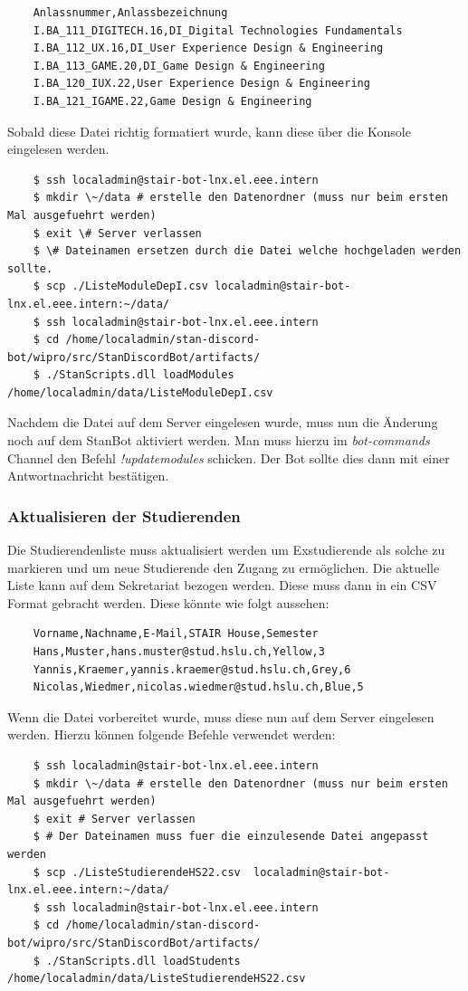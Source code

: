 \documentclass[a4paper, table]{article}
\begin{document}
\begin{lstlisting}
    Anlassnummer,Anlassbezeichnung
    I.BA_111_DIGITECH.16,DI_Digital Technologies Fundamentals
    I.BA_112_UX.16,DI_User Experience Design & Engineering
    I.BA_113_GAME.20,DI_Game Design & Engineering
    I.BA_120_IUX.22,User Experience Design & Engineering
    I.BA_121_IGAME.22,Game Design & Engineering
\end{lstlisting}
Sobald diese Datei richtig formatiert wurde, kann diese über die Konsole eingelesen werden.
\begin{lstlisting}
    $ ssh localadmin@stair-bot-lnx.el.eee.intern
    $ mkdir \~/data # erstelle den Datenordner (muss nur beim ersten Mal ausgefuehrt werden)
    $ exit \# Server verlassen
    $ \# Dateinamen ersetzen durch die Datei welche hochgeladen werden sollte.
    $ scp ./ListeModuleDepI.csv localadmin@stair-bot-lnx.el.eee.intern:~/data/
    $ ssh localadmin@stair-bot-lnx.el.eee.intern
    $ cd /home/localadmin/stan-discord-bot/wipro/src/StanDiscordBot/artifacts/
    $ ./StanScripts.dll loadModules /home/localadmin/data/ListeModuleDepI.csv
\end{lstlisting}
Nachdem die Datei auf dem Server eingelesen wurde, muss nun die Änderung noch auf dem StanBot aktiviert werden.
Man muss hierzu im \textit{bot-commands} Channel den Befehl \textit{!updatemodules} schicken.
Der Bot sollte dies dann mit einer Antwortnachricht bestätigen.

\newpage
\subsubsection{Aktualisieren der Studierenden}

Die Studierendenliste muss aktualisiert werden um Exstudierende als solche zu markieren und um neue Studierende den Zugang zu ermöglichen.
Die aktuelle Liste kann auf dem Sekretariat bezogen werden.
Diese muss dann in ein CSV Format gebracht werden.
Diese könnte wie folgt aussehen:
\begin{lstlisting}
    Vorname,Nachname,E-Mail,STAIR House,Semester
    Hans,Muster,hans.muster@stud.hslu.ch,Yellow,3
    Yannis,Kraemer,yannis.kraemer@stud.hslu.ch,Grey,6
    Nicolas,Wiedmer,nicolas.wiedmer@stud.hslu.ch,Blue,5
\end{lstlisting}
Wenn die Datei vorbereitet wurde, muss diese nun auf dem Server eingelesen werden.
Hierzu können folgende Befehle verwendet werden:
\begin{lstlisting}
    $ ssh localadmin@stair-bot-lnx.el.eee.intern
    $ mkdir \~/data # erstelle den Datenordner (muss nur beim ersten Mal ausgefuehrt werden)
    $ exit # Server verlassen
    $ # Der Dateinamen muss fuer die einzulesende Datei angepasst werden
    $ scp ./ListeStudierendeHS22.csv  localadmin@stair-bot-lnx.el.eee.intern:~/data/
    $ ssh localadmin@stair-bot-lnx.el.eee.intern
    $ cd /home/localadmin/stan-discord-bot/wipro/src/StanDiscordBot/artifacts/
    $ ./StanScripts.dll loadStudents /home/localadmin/data/ListeStudierendeHS22.csv
\end{lstlisting}
\end{document}
